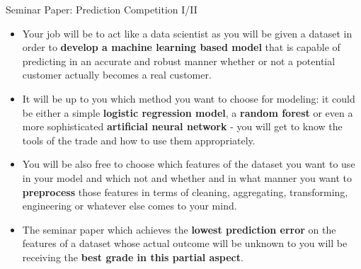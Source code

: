\documentclass[document.tex]{subfiles}
\begin{document}
    \begin{frame}{Seminar Paper: Prediction Competition I/II}
        \begin{itemize}
            \item Your job will be to act like a data scientist as you will be given a dataset in order to \textbf{develop a machine learning based model} that is capable of predicting in an accurate and robust manner whether or not a potential customer actually becomes a real customer.
            \item It will be up to you which method you want to choose for modeling: it could be either a simple \textbf{logistic regression model}, a \textbf{random forest} or even a more sophisticated \textbf{artificial neural network} - you will get to know the tools of the trade and how to use them appropriately.
            \item You will be also free to choose which features of the dataset you want to use in your model and which not and whether and in what manner you want to \textbf{preprocess} those features in terms of cleaning, aggregating, transforming, engineering or whatever else comes to your mind.
            \item The seminar paper which achieves the \textbf{lowest prediction error} on the features of a dataset whose actual outcome will be unknown to you will be receiving the \textbf{best grade in this partial aspect}.
        \end{itemize}
    \end{frame}
\end{document}
